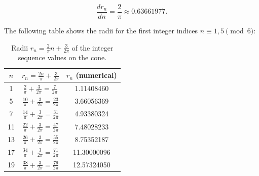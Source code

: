 \begin{equation}\label{eq:wachstumsrate}
  \frac{dr_n}{dn} = \frac{2}{\pi} \approx 0.63661977.
\end{equation}

The following table shows the radii for the first integer
indices $n \equiv 1, 5 \pmod{6}$:

\begin{table}[H]
\centering
\renewcommand{\arraystretch}{1.2}
\caption{Radii $r_n = \tfrac{2}{\pi}n + \tfrac{3}{2\pi}$ of the integer
  sequence values on the cone.}
\begin{tabular}{ccc}
\toprule
$n$ & $r_n = \tfrac{2n}{\pi}+\tfrac{3}{2\pi}$ & $r_n$ (numerical) \\
\midrule
 1  & $\tfrac{2}{\pi}+\tfrac{3}{2\pi} = \tfrac{7}{2\pi}$  &  1.11408460 \\
 5  & $\tfrac{10}{\pi}+\tfrac{3}{2\pi} = \tfrac{23}{2\pi}$ &  3.66056369 \\
 7  & $\tfrac{14}{\pi}+\tfrac{3}{2\pi} = \tfrac{31}{2\pi}$ &  4.93380324 \\
11  & $\tfrac{22}{\pi}+\tfrac{3}{2\pi} = \tfrac{47}{2\pi}$ &  7.48028233 \\
13  & $\tfrac{26}{\pi}+\tfrac{3}{2\pi} = \tfrac{55}{2\pi}$ &  8.75352187 \\
17  & $\tfrac{34}{\pi}+\tfrac{3}{2\pi} = \tfrac{71}{2\pi}$ & 11.30000096 \\
19  & $\tfrac{38}{\pi}+\tfrac{3}{2\pi} = \tfrac{79}{2\pi}$ & 12.57324050 \\
\bottomrule
\end{tabular}
\end{table}

